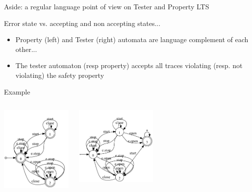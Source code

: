 \documentclass[11pt]{beamer}
\begin{document}
\begin{frame}{Aside: a regular language point of view on Tester and Property LTS}
	\begin{block}{Error state vs. accepting and non accepting states...}
		\begin{itemize}
			\item Property (left) and Tester (right) automata are language complement of each other...
			\item The tester automaton (resp property) accepts all traces violating (resp. not violating) the safety property
		\end{itemize}
	\end{block}
	\begin{block}{Example}
		\vspace{-0.5cm}
		\begin{columns}
				\begin{center} 
					\includegraphics[width=3.5cm, trim=0mm 0mm 0mm 10mm, clip]{MaintainDoorsClosedWhileMoving_property.pdf}
				\end{center}
				\begin{center} 
					\includegraphics[width=4cm, trim=0mm 0mm 0mm 10mm, clip]{MaintainDoorsClosedWhileMoving_tester.pdf}
				\end{center}
		\end{columns}
	\end{block}
\end{frame}
\end{document}
